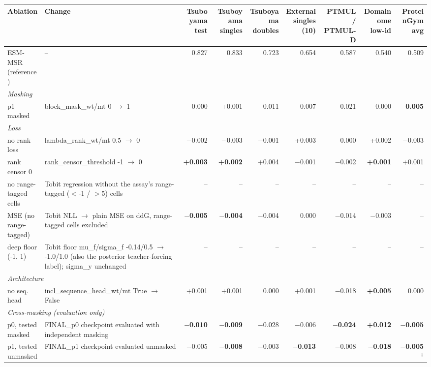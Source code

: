 \begin{tabular}{llrrrrrrr}
\toprule
Ablation & Change & Tsuboyama test & Tsuboyama singles & Tsuboyama doubles & External singles (10) & PTMUL / PTMUL-D & Domainome low-id & ProteinGym avg \\
\midrule
ESM-MSR (reference) & -- & 0.827 & 0.833 & 0.723 & 0.654 & 0.587 & 0.540 & 0.509 \\
\midrule
\multicolumn{9}{l}{\textit{Masking}} \\
p1 masked & block\_mask\_wt/mt 0 $\to$ 1 & 0.000 & +0.001 & $-$0.011 & $-$0.007 & $-$0.021 & 0.000 & \textbf{$-$0.005} \\
\midrule
\multicolumn{9}{l}{\textit{Loss}} \\
no rank loss & lambda\_rank\_wt/mt 0.5 $\to$ 0 & $-$0.002 & $-$0.003 & $-$0.001 & +0.003 & 0.000 & +0.002 & $-$0.003 \\
rank censor 0 & rank\_censor\_threshold -1 $\to$ 0 & \textbf{+0.003} & \textbf{+0.002} & +0.004 & $-$0.001 & $-$0.002 & \textbf{+0.001} & +0.001 \\
no range-tagged cells & Tobit regression without the assay's range-tagged ($<$-1 / $>$5) cells & -- & -- & -- & -- & -- & -- & -- \\
MSE (no range-tagged) & Tobit NLL $\to$ plain MSE on ddG, range-tagged cells excluded & \textbf{$-$0.005} & \textbf{$-$0.004} & $-$0.004 & 0.000 & $-$0.014 & $-$0.003 & -- \\
deep floor (-1, 1) & Tobit floor mu\_f/sigma\_f -0.14/0.5 $\to$ -1.0/1.0 (also the posterior teacher-forcing label); sigma\_y unchanged & -- & -- & -- & -- & -- & -- & -- \\
\midrule
\multicolumn{9}{l}{\textit{Architecture}} \\
no seq. head & incl\_sequence\_head\_wt/mt True $\to$ False & +0.001 & +0.001 & 0.000 & +0.001 & $-$0.018 & \textbf{+0.005} & 0.000 \\
\midrule
\multicolumn{9}{l}{\textit{Cross-masking (evaluation only)}} \\
p0, tested masked & FINAL\_p0 checkpoint evaluated with independent masking & \textbf{$-$0.010} & \textbf{$-$0.009} & $-$0.028 & $-$0.006 & \textbf{$-$0.024} & \textbf{+0.012} & \textbf{$-$0.005} \\
p1, tested unmasked & FINAL\_p1 checkpoint evaluated unmasked & $-$0.005 & \textbf{$-$0.008} & $-$0.003 & \textbf{$-$0.013} & $-$0.008 & \textbf{$-$0.018} & \textbf{$-$0.005}$^\ddagger$ \\
\bottomrule
\end{tabular}
